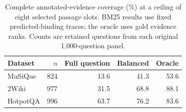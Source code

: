 \begin{table}[htbp]
\centering
\small
\caption{Complete annotated-evidence coverage (\%) at a ceiling of eight selected passage slots. BM25 results use fixed predicted-binding traces; the oracle uses gold evidence ranks. Counts are retained questions from each original 1,000-question panel.}
\label{tab:ch4-bm25-availability}
\begin{tabular}{lrrrr}
\hline
Dataset & $n$ & Full question & Balanced & Oracle \\
\hline
MuSiQue & 824 & 13.6 & 41.3 & 53.6 \\
2Wiki & 977 & 31.5 & 68.8 & 88.1 \\
HotpotQA & 996 & 63.7 & 76.2 & 83.6 \\
\hline
\end{tabular}
\end{table}
